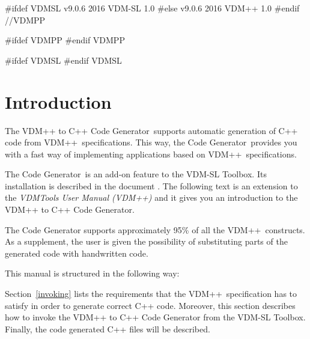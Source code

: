 \documentclass[\pformat,12pt]{article}
\newcommand{\ToolboxName}{VDM-SL Toolbox}
\newcommand{\toolbox}{Toolbox}
\newcommand{\ToolboxName}{VDM++ Toolbox}
\newcommand{\toolbox}{toolbox}
\begin{document}
#ifdef VDMSL
       {v9.0.6}
       {2016}
       {VDM-SL}
       {1.0}
#else
       {v9.0.6}
       {2016}
       {VDM++}
       {1.0}
#endif //VDMPP


\newcommand{\tcg}{the Code Generator}
\newcommand{\Tcg}{The Code Generator}

#ifdef VDMPP
\newcommand{\libmancite}{\cite{LibMan-CSK}}
\newcommand{\langmancite}{\cite{LangManPP-CSK}}
\newcommand{\VDM}{VDM++}
\newcommand{\cg}{VDM++ to C++ Code Generator}
\newcommand{\MCL}{VDM C++ Library}
\newcommand{\CGBase}{\texttt{CGBase}}
#endif VDMPP

#ifdef VDMSL
\newcommand{\libmancite}{\cite{LibMan-CSK}}
\newcommand{\langmancite}{\cite{LangMan-CSK}}
\newcommand{\cg}{VDM-SL to C++ Code Generator}
\newcommand{\MCL}{VDM C++ Library}
\newcommand{\VDM}{VDM-SL}
#endif VDMSL


\section{Introduction}


The \cg\ supports automatic generation of C++ code from \VDM\ 
specifications. This way, \tcg\ provides you with a fast way of
implementing applications based on \VDM\ specifications.

 \Tcg\ is an add-on
feature to the \ToolboxName{}. Its installation is described in the document
\ifthenelse{\boolean{VDMsl}}{\cite{InstallMan-CSK}}{\cite{InstallPPMan-CSK}}.
The following text is an extension to the {\em VDMTools User Manual (\VDM{})}
\ifthenelse{\boolean{VDMsl}}{\cite{UserMan-CSK}}{\cite{UserManPP-CSK}} and it
gives you an introduction to 
the \cg{}.

The Code Generator supports approximately 95\% of all the \VDM\ constructs.
As a supplement, the user is given the possibility of substituting parts of
the generated code with handwritten code. 

This manual is structured in the following way:

Section~\ref{invoking} lists the requirements that the \VDM\ specification
has to satisfy in order to generate correct C++ code.
Moreover, this section describes how to invoke the \cg{} from the
 \ToolboxName{}. Finally, the code generated C++ files will be described.
\end{document}
